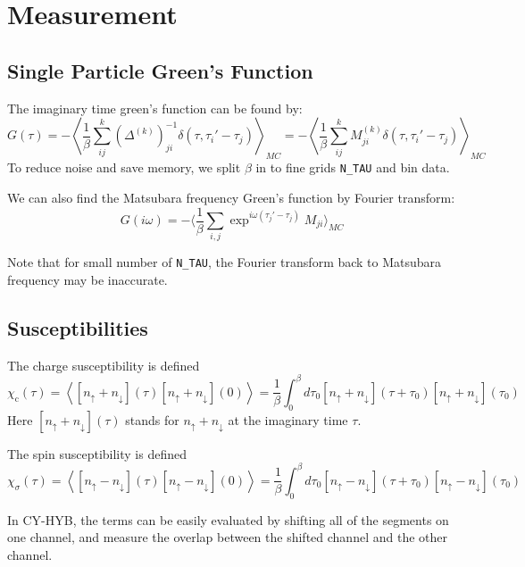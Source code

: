 \section{Measurement}
\label{sec:cthyb_measurement}
\subsection{Single Particle Green's Function}
The imaginary time green's function can be found by:
\[
G(\tau)=-\left\langle\frac{1}{\beta}\sum_{ij}^k
\left(\Delta^{(k)}\right)^{-1}_{ji}\delta(\tau,\tau_i'-\tau_j)\right\rangle_{MC}
=-\left\langle\frac{1}{\beta}\sum_{ij}^k
M^{(k)}_{ji}\delta(\tau,\tau_i'-\tau_j)\right\rangle_{MC}
\]
To reduce noise and save memory, we split $\beta$ in to fine grids \verb|N_TAU| 
and bin data. 

We can also find the Matsubara frequency Green's function by 
Fourier transform:
\[
G(i\omega)=-\langle\frac{1}{\beta}\sum_{i,j}\exp^{i\omega(\tau_j'-\tau_j)}M_{ji}\rangle_{MC}
\]

Note that for small number of \verb|N_TAU|,
the Fourier transform back to Matsubara frequency may be inaccurate. 


\subsection{Susceptibilities}

The charge susceptibility is defined 
\begin{equation}
  \label{eq:chi-charge}
  \chi_\mathrm{c}(\tau)=\left\langle[n_\uparrow+n_\downarrow](\tau)  [n_\uparrow+n_\downarrow](0)\right\rangle=\frac{1}{\beta}\int_0^\beta d\tau_0[n_\uparrow+n_\downarrow](\tau+\tau_0)  [n_\uparrow+n_\downarrow](\tau_0)
\end{equation}
Here $[n_\uparrow+n_\downarrow](\tau)$ stands for $n_\uparrow+n_\downarrow$ 
at the imaginary time $\tau$.

The spin susceptibility is defined 
\begin{equation}
  \label{eq:chi-spin}
  \chi_\sigma(\tau)=\left\langle[n_\uparrow-n_\downarrow](\tau)  [n_\uparrow-n_\downarrow](0)\right\rangle=\frac{1}{\beta}\int_0^\beta d\tau_0[n_\uparrow-n_\downarrow](\tau+\tau_0)  [n_\uparrow-n_\downarrow](\tau_0)
\end{equation}

In CY-HYB, the terms can be easily evaluated by shifting all of the segments on one
channel, and measure the overlap between the shifted channel and the other channel.



